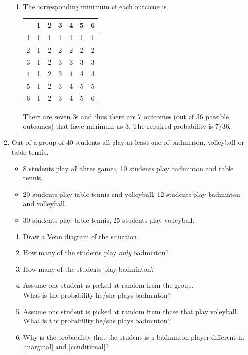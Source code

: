 \begin{enumerate}
{\begin{enumerate}
\begin{center}
          \end{center}
          There are five 6s and thus there are 5 outcomes (out of 36 possible outcomes)
          that have sum as 6. The
          required probability is 5/36.
        \item The corresponding minimum of each outcome is
          \begin{center}
            \begin{tabular}{c|cccccc}
              & 1 & 2 & 3 & 4 & 5 & 6\\\hline
              1 & 1 & 1 & 1 & 1 & 1 & 1\\
              2 & 1 & 2 & 2 & 2 & 2 & 2\\ 
              3 & 1 & 2 & 3 & 3 & 3 & 3\\ 
              4 & 1 & 2 & 3 & 4 & 4 & 4\\ 
              5 & 1 & 2 & 3 & 4 & 5 & 5\\ 
              6 & 1 & 2 & 3 & 4 & 5 & 6
            \end{tabular}
          \end{center}
          There are seven 3s and thus there are 7 outcomes (out of 36 possible outcomes)
          that have minimum as 3. The
          required probability is 7/36.
      \end{enumerate}
    }
    
\item
  Out of a group of 40 students all play at least one of badminton, volleyball or table tennis.
  \begin{itemize}
    \item 8 students play all three games, 10 students play badminton and table tennis.
    \item 20 students play table tennis and volleyball, 12 students play badminton and volleyball.
    \item 30 students play table tennis, 25 students play volleyball.
  \end{itemize}
  \begin{enumerate}
    \item
      Draw a Venn diagram of the situation.
    \item
      How many of the students play \emph{only} badminton?
    \item
      How many of the students play badminton?
    \item \label{marginal}
      Assume one student is picked at random from the group.\\
      What is the probability he/she plays badminton?
    \item \label{conditional}
      Assume one student is picked at random from those that play voleyball.\\
      What is the probability he/she plays badminton?
    \item
      Why is the probability that the student is a badminton player different in \ref{marginal} and \ref{conditional}?
  \end{enumerate}


\end{enumerate}
